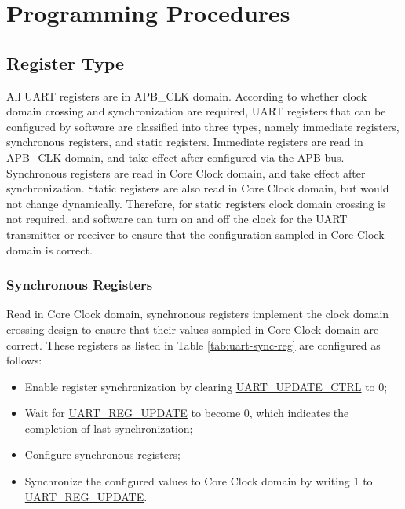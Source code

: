 \documentclass[main\_\_EN.tex]{subfiles}
\begin{document}
\section{Programming Procedures}\label{sec:uart-program}

\subsection{Register Type}

All UART registers are in APB\_CLK domain. According to whether clock domain crossing and synchronization are required, UART registers that can be configured by software are classified into three types, namely immediate registers, synchronous registers, and static registers. Immediate registers are read in APB\_CLK domain, and take effect after configured via the APB bus. Synchronous registers are read in Core Clock domain, and take effect after synchronization. Static registers are also read in Core Clock domain, but would not change dynamically. Therefore, for static registers clock domain crossing is not required, and software can turn on and off the clock for the UART transmitter or receiver to ensure that the configuration sampled in Core Clock domain is correct.

\subsubsection{Synchronous Registers}

Read in Core Clock domain, synchronous registers implement the clock domain crossing design to ensure that their values sampled in Core Clock domain are correct. These registers as listed in Table \ref{tab:uart-sync-reg} are configured as follows:

\begin{itemize}
    \item Enable register synchronization by clearing \hyperref[fielddesc:UARTUPDATECTRL]{UART\_UPDATE\_CTRL} to 0;
    \item Wait for \hyperref[fielddesc:UARTREGUPDATE]{UART\_REG\_UPDATE} to become 0, which indicates the completion of last synchronization;
    \item Configure synchronous registers;
    \item Synchronize the configured values to Core Clock domain by writing 1 to \hyperref[fielddesc:UARTREGUPDATE]{UART\_REG\_UPDATE}.
\end{itemize}
\end{document}
